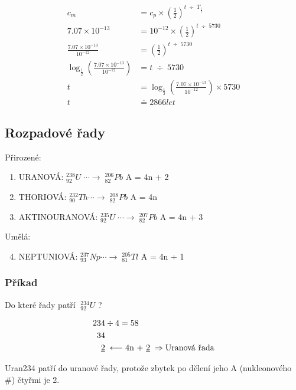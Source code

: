 \begin{align*}
    c_{m} &= c_{p} \times \left(\frac{1}{2}\right)^{t \; \div \;  T_{\frac{1}{2}}} \\
    7.07 \times 10^{-13} &= 10^{-12} \times \left(\frac{1}{2}\right)^{t \; \div \;  5730} \\
    \frac{7.07 \times 10^{-13}}{10^{-12}} &= \left(\frac{1}{2}\right)^{t \; \div \;  5730} \\
    \log_{\frac{1}{2}}\left(\frac{7.07 \times 10^{-13}}{10^{-12}}\right) &= t \; \div \;  5730 \\
    t &= \log_{\frac{1}{2}}\left(\frac{7.07 \times 10^{-13}}{10^{-12}}\right) \times 5730 \\
    t &\doteq 2866 let
\end{align*}

\TabPositions{0em, 15em, 30em}
\subsection{Rozpadové řady}
Přirozené:
\begin{enumerate}
    \item URANOVÁ: \tab $^{238}_{92}U \; \cdots \longrightarrow \; ^{206}_{82}Pb$ \tab A = 4n + 2
    \item THORIOVÁ: \tab $^{232}_{90}Th \cdots \longrightarrow \; ^{208}_{82}Pb$ \tab A = 4n
    \item AKTINOURANOVÁ: \tab $^{235}_{92}U \; \cdots \longrightarrow \; ^{207}_{82}Pb$ \tab A = 4n + 3 
\end{enumerate}

Umělá:
\begin{enumerate}
    \setcounter{enumi}{3}
    \item NEPTUNIOVÁ: \tab $^{237}_{93}Np \cdots \longrightarrow \; ^{205}_{81}Tl$ \tab A = 4n + 1
\end{enumerate}

\subsubsection{Příkad}
Do které řady patří $\; ^{234}_{92}U$ ?

\begin{align*}
    234&\div 4 = 58 \\
    34& \\
    \underline{2}& \; \longleftarrow \mbox{4n + \underline{2}} \; \Rightarrow \mbox{Uranová řada}\\
\end{align*}

Uran234 patří do uranové řady, protože zbytek po dělení jeho A (nukleonového \#) čtyřmi je 2. 